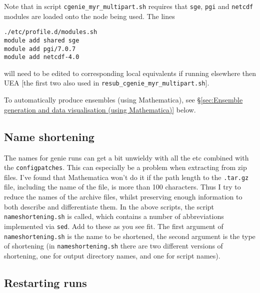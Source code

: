 \documentclass[10pt,a4paper, onecolumn]{article}
\begin{document}
\begin{enumerate}
Note that in script \texttt{cgenie\_myr\_multipart.sh} requires that \texttt{sge}, \texttt{pgi} and \texttt{netcdf} modules are loaded onto the node being used. The lines 

\texttt{./etc/profile.d/modules.sh \\
module add shared sge \\
module add pgi/7.0.7 \\
module add netcdf-4.0}

will need to be edited to corresponding local equivalents if running elsewhere then UEA [the first two also used in \texttt{resub\_cgenie\_myr\_multipart.sh}].

\end{enumerate}

To automatically produce ensembles (using Mathematica), see \S\ref{sec:Ensemble generation and data visualisation (using Mathematica)} below.

\subsection{Name shortening}

The names for genie runs can get a bit unwieldy with all the \texttt{} etc combined with the \texttt{configpatches}. This can especially be a problem when extracting from zip files. I've found that Mathematica won't do it if the path length to the \texttt{.tar.gz} file, including the name of the file, is more than 100 characters. Thus I try to reduce the names of the archive files, whilst preserving enough information to both describe and differentiate them. In the above scripts, the script \texttt{nameshortening.sh} is called, which contains a number of abbreviations implemented via \texttt{sed}. Add to these as you see fit. The first argument of \texttt{nameshortening.sh} is the name to be shortened, the second argument is the type of shortening (in \texttt{nameshortening.sh} there are two different versions of shortening, one for output directory names, and one for script names). 


\subsection{Restarting runs}
\end{document}
